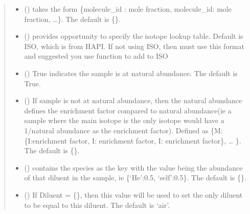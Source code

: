 \documentclass[letterpaper,10pt,english]{sphinxmanual}
\begin{document}
\begin{fulllineitems}
\begin{quote}
\begin{description}
\begin{itemize}
\item {} 
\sphinxAtStartPar
{} (\sphinxstyleliteralemphasis{\sphinxupquote{, }}) \textendash{} takes the form \{molecule\_id : mole fraction, molecule\_id: mole fraction, …\}. The default is \{\}.

\item {} 
\sphinxAtStartPar
{} (\sphinxstyleliteralemphasis{\sphinxupquote{, }}) \textendash{} provides opportunity to specify the isotope look\sphinxhyphen{}up table.  Default is ISO, which is from HAPI.  If not using ISO, then must use this format and suggested you use function to add to ISO

\item {} 
\sphinxAtStartPar
{} (\sphinxstyleliteralemphasis{\sphinxupquote{, }}) \textendash{} True indicates the sample is at natural abundance. The default is True.

\item {} 
\sphinxAtStartPar
{} (\sphinxstyleliteralemphasis{\sphinxupquote{, }}) \textendash{} If sample is not at natural abundance, then the natural abundance defines the enrichment factor compared to natural abundance(ie a sample where the main isotope is the only isotope would have a 1/natural abundance as the enrichment factor). Defined as \{M:\{I:enrichment factor, I: enrichment factor, I: enrichment factor\}, … \}. The default is \{\}.

\item {} 
\sphinxAtStartPar
{} (\sphinxstyleliteralemphasis{\sphinxupquote{, }}) \textendash{} contains the species as the key with the value being the abundance of that diluent in the sample, ie \{‘He’:0.5, ‘self’:0.5\}. The default is \{\}.

\item {} 
\sphinxAtStartPar
{} (\sphinxstyleliteralemphasis{\sphinxupquote{, }}) \textendash{} If Diluent = \{\}, then this value will be used to set the only diluent to be equal to this diluent. The default is ‘air’.


\end{itemize}
\end{description}
\end{quote}
\end{fulllineitems}
\end{document}
